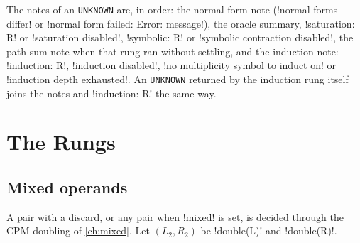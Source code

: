 The notes of an \texttt{UNKNOWN} are, in order: the normal-form note (\code!normal forms differ! or \code!normal form failed: Error: message!), the oracle summary, \code!saturation: R! or \code!saturation disabled!, \code!symbolic: R! or \code!symbolic contraction disabled!, the path-sum note when that rung ran without settling, and the induction note: \code!induction: R!, \code!induction disabled!, \code!no multiplicity symbol to induct on! or \code!induction depth exhausted!. An \texttt{UNKNOWN} returned by the induction rung itself joins the notes and \code!induction: R! the same way.

\section{The Rungs}\label{sec:proofs-rungs}

\subsection{Mixed operands}\label{sec:proofs-doubled}

A pair with a discard, or any pair when \py!mixed! is set, is decided through the CPM doubling of \cref{ch:mixed}. Let $(L_2,R_2)$ be \py!double(L)! and \py!double(R)!.


